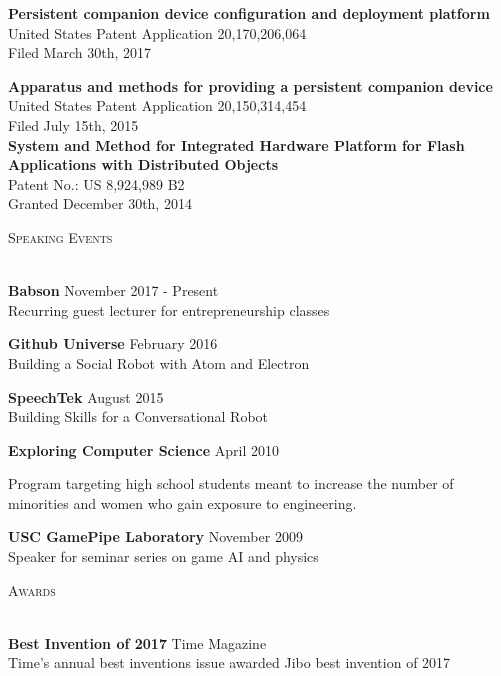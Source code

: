 \documentclass[a4paper]{article}
\newcommand{\lineunder} {
    \vspace*{-8pt} \\
    \hspace*{-18pt} \hrulefill \\
}
\newcommand{\header} [1] {
    {\hspace*{-18pt}\vspace*{6pt} \textsc{#1}}
    \vspace*{-6pt} \lineunder
    \vspace{2mm}
}
\begin{document}
\textbf{Persistent companion device configuration and deployment platform}\\
United States Patent Application 20,170,206,064\\
Filed March 30th, 2017
\vspace*{2mm}

\textbf{Apparatus and methods for providing a persistent companion device}\\
United States Patent Application 20,150,314,454\\
Filed July 15th, 2015\\

\vspace*{2mm}
\textbf{System and Method for Integrated Hardware Platform for Flash Applications
with Distributed Objects}\\
Patent No.: US 8,924,989 B2\\
Granted December 30th, 2014 \\
\vspace*{4mm}

\header{Speaking Events}
\textbf{Babson} \hfill November 2017 - Present\\
Recurring guest lecturer for entrepreneurship classes 
\vspace*{2mm}

\textbf{Github Universe} \hfill February 2016\\
Building a Social Robot with Atom and Electron 
\vspace*{2mm}

\textbf{SpeechTek} \hfill August 2015\\
Building Skills for a Conversational Robot 
\vspace*{2mm}

\pagebreak[3]

\textbf{Exploring Computer Science} \hfill April 2010\\
\begin{addmargin}[0em]{4em}
Program targeting high school students meant to increase the number of
minorities and women who gain exposure to engineering.
\end{addmargin}
\vspace*{2mm}

\textbf{USC GamePipe Laboratory} \hfill November 2009\\
Speaker for seminar series on game AI and physics 
\vspace*{4mm}

\header{Awards}

\textbf{Best Invention of 2017} \hfill Time Magazine\\
Time's annual best inventions issue awarded Jibo best invention of 2017
\vspace*{2mm}
\end{document}
